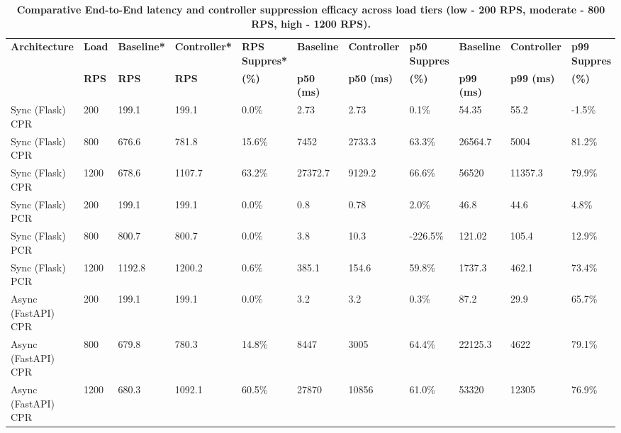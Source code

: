 \documentclass{ieeeaccess}
\begin{document}
\begin{table}[htbp]
	\centering
	\caption{\textbf{Comparative End-to-End latency and controller suppression efficacy across load tiers (low - 200 RPS, moderate - 800 RPS, high - 1200 RPS).}}
	\label{tab:compare-analysis}
	\setlength{\tabcolsep}{3pt}
		\begin{tabular}{lllllllllll}
			\hline
			\textbf{Architecture}& \textbf{Load}& \textbf{Baseline*}& \textbf{Controller*}& \textbf{RPS Suppres*}& \textbf{Baseline}& \textbf{Controller}& \textbf{p50 Suppres}& \textbf{Baseline}& \textbf{Controller}& \textbf{p99 Suppres}\\
			
			& \textbf{RPS}& \textbf{RPS}& \textbf{RPS}& \textbf{(\%)}& \textbf{p50 (ms)}& \textbf{p50 (ms)}& \textbf{(\%)}& \textbf{p99 (ms)}& \textbf{p99 (ms)}& \textbf{(\%)}\\
			
			\hline
			
			Sync (Flask) CPR & 200  & 199.1  & 199.1   & 0.0\%  & 2.73     & 2.73    & 0.1\%    & 54.35    & 55.2    & -1.5\%\\
			Sync (Flask) CPR & 800  & 676.6  & 781.8   & 15.6\% & 7452     & 2733.3  & 63.3\%   & 26564.7  & 5004    & 81.2\%\\
			Sync (Flask) CPR & 1200 & 678.6  & 1107.7  & 63.2\% & 27372.7  & 9129.2  & 66.6\%   & 56520    & 11357.3 & 79.9\%\\
			\hline
			
			Sync (Flask) PCR & 200  & 199.1   & 199.1  & 0.0\%  & 0.8    & 0.78    & 2.0\%    & 46.8     & 44.6   & 4.8\%\\
			Sync (Flask) PCR & 800  & 800.7   & 800.7  & 0.0\%  & 3.8    & 10.3    & -226.5\% & 121.02   & 105.4  & 12.9\%\\
			Sync (Flask) PCR & 1200 & 1192.8 & 1200.2  & 0.6\%  & 385.1  & 154.6   & 59.8\%   & 1737.3   & 462.1  & 73.4\%\\
			\hline
			
			Async (FastAPI) CPR & 200  & 199.1  & 199.1  & 0.0\%  & 3.2   & 3.2   & 0.3\%  & 87.2     & 29.9  & 65.7\% \\
			Async (FastAPI) CPR & 800  & 679.8  & 780.3  & 14.8\% & 8447  & 3005  & 64.4\% & 22125.3  & 4622  & 79.1\% \\
			Async (FastAPI) CPR & 1200 & 680.3  & 1092.1 & 60.5\% & 27870 & 10856 & 61.0\% & 53320    & 12305 & 76.9\% \\
			\hline
						

\end{tabular}
\end{table}
\end{document}
